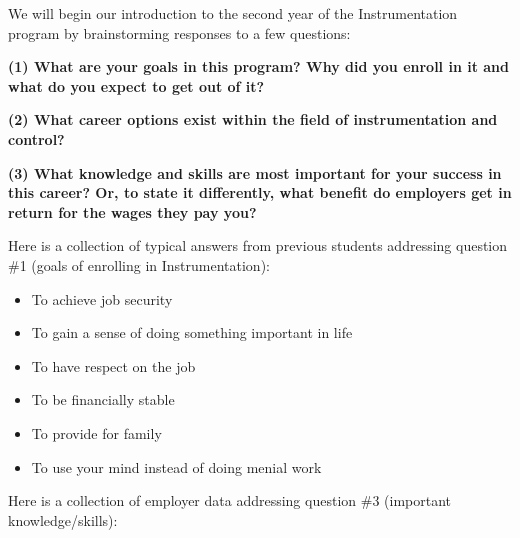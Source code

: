 
We will begin our introduction to the second year of the Instrumentation program by brainstorming responses to a few questions:

\vskip 20pt

\noindent
{\bf (1) What are your goals in this program?  Why did you enroll in it and what do you expect to get out of it?}

\vskip 20pt

\noindent
{\bf (2) What career options exist within the field of instrumentation and control?}

\vskip 20pt

\noindent
{\bf (3) What knowledge and skills are most important for your success in this career?  Or, to state it differently, what benefit do employers get in return for the wages they pay you?}

\vskip 20pt








\noindent
Here is a collection of typical answers from previous students addressing question \#1 (goals of enrolling in Instrumentation):

\begin{itemize}
\item{} To achieve job security
\item{} To gain a sense of doing something important in life
\item{} To have respect on the job
\item{} To be financially stable
\item{} To provide for family
\item{} To use your mind instead of doing menial work
\end{itemize}

\vskip 10pt

\noindent
Here is a collection of employer data addressing question \#3 (important knowledge/skills):

